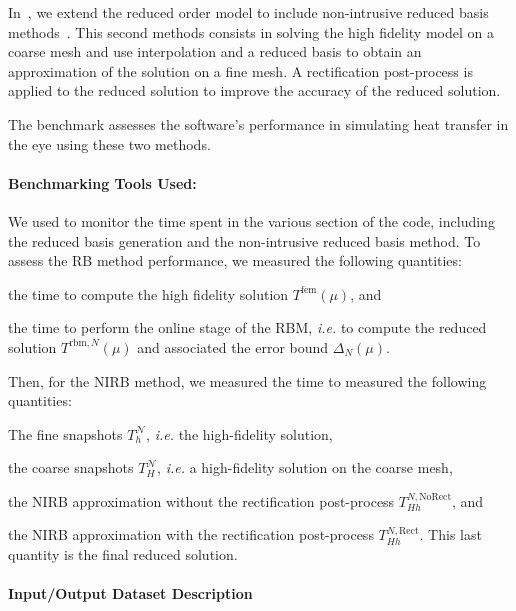 In~\cite{saigre_mathematical_2024}, we extend the reduced order model to include non-intrusive reduced basis methods~\cite{CRMATH_2009__347_7-8_435_0}.
This second methods consists in solving the high fidelity model on a coarse mesh and use interpolation and a reduced basis to obtain an approximation of the solution on a fine mesh.
A rectification post-process is applied to the reduced solution to improve the accuracy of the reduced solution.

The benchmark assesses the software's performance in simulating heat transfer in the eye using these two methods.

\paragraph{Benchmarking Tools Used:} We used \Feelpp to monitor the time spent in the various section of the code, including the reduced basis generation and the non-intrusive reduced basis method. To assess the \ac{RB} method performance, we measured the following quantities:
\begin{inparaenum}[\it (i)]
    \item the time to compute the high fidelity solution $T^\text{fem}(\mu)$, and
    \item the time to perform the online stage of the RBM, \emph{i.e.} to compute the reduced solution $T^{\text{rbm}, N}(\mu)$ and associated the error bound $\Delta_N(\mu)$.
\end{inparaenum}

Then, for the \ac{NIRB} method, we measured the time to measured the following quantities:
\begin{inparaenum}[\it (i)]
    \item The fine snapshots $T_h^\mathcal{N}$, \emph{i.e.} the high-fidelity solution,
    \item the coarse snapshots $T_H^\mathcal{N}$, \emph{i.e.} a high-fidelity solution on the coarse mesh,
    \item the NIRB approximation without the rectification post-process $T_{Hh}^{N,\text{NoRect}}$, and
    \item the NIRB approximation with the rectification post-process $T_{Hh}^{N,\text{Rect}}$. This last quantity is the final reduced solution.
\end{inparaenum}

\paragraph{Input/Output Dataset Description}

